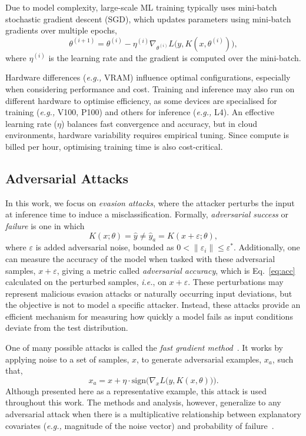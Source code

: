 \documentclass[conference]{IEEEtran}%
\begin{document}
Due to model complexity, large-scale ML training typically uses mini-batch stochastic gradient descent (SGD), which updates parameters using mini-batch gradients over multiple epochs,
\begin{equation}
    \theta^{(i+1)} = \theta^{(i)} - \eta^{(i)} \nabla_{\theta^{(i)}} L\big(y, K(x, \theta^{(i)})\big),
\end{equation}
where $\eta^{(i)}$ is the learning rate and the gradient is computed over the mini-batch.

Hardware differences (\textit{e.g.,} VRAM) influence optimal configurations, especially when considering performance and cost. 
Training and inference may also run on different hardware to optimise efficiency, as some devices are specialised for training (\textit{e.g.,} V100, P100) and others for inference (\textit{e.g.,} L4).
An effective learning rate ($\eta$) balances fast convergence and accuracy, but in cloud environments, hardware variability requires empirical tuning.
Since compute is billed per hour, optimising training time is also cost-critical.

\subsection{Adversarial Attacks}
\label{attacks}

In this work, we focus on \textit{evasion attacks}, where the attacker perturbs the input at inference time to induce a misclassification. 
Formally, \textit{adversarial success} or \textit{failure} is one in which
\begin{equation} \label{eq:adv_success}
    K(x; \theta ) = \hat{y} \neq \hat{y}_a = K(x + \varepsilon; \theta),
\end{equation}
where $\varepsilon$ is added adversarial noise,  bounded as $0 < \|\varepsilon_i\| \leq \varepsilon^*$.
Additionally, one can measure the accuracy of the model when tasked with these adversarial samples, $x + \varepsilon$, giving a metric called \textit{adversarial accuracy}, which is Eq.~\ref{eq:acc} calculated on the perturbed samples, \textit{i.e.}, on $x + \varepsilon$. 
These perturbations may represent malicious evasion attacks or naturally occurring input deviations, but the objective is not to model a specific attacker.
Instead, these attacks provide an efficient mechanism for measuring how quickly a model fails as input conditions deviate from the test distribution.

One of many possible attacks is called the \textit{fast gradient method}~\cite{fgm}. 
It works by applying noise to a set of samples, $x$, to generate adversarial examples, $x_a$, such that,
\begin{equation}
    x_a = x + \eta \cdot \mathrm{sign}\Big(\nabla_x L\big(y, K(x, \theta)\big)\Big).
\label{eq:fgm}
\end{equation}
Although presented here as a representative example, this attack is used throughout this work. 
The methods and analysis, however, generalize to any adversarial attack when there is a multiplicative relationship between explanatory covariates (\textit{e.g.,} magnitude of the noise vector) and probability of failure~\cite{meyers_aft,aft_models,kleinbaum1996survival}.
\end{document}
